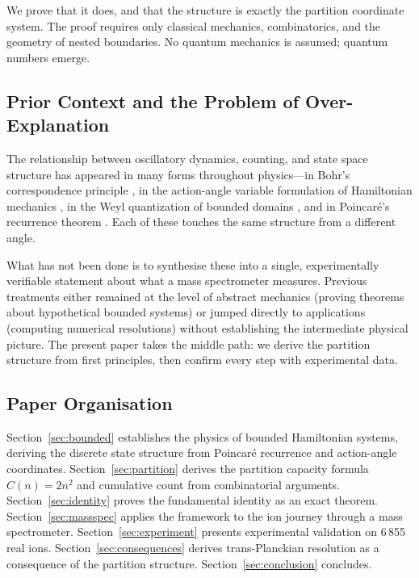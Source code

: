\documentclass[twocolumn,10pt]{article}
\begin{document}
We prove that it does, and that the structure is exactly the partition coordinate system. The proof requires only classical mechanics, combinatorics, and the geometry of nested boundaries. No quantum mechanics is assumed; quantum numbers emerge.

\subsection{Prior Context and the Problem of Over-Explanation}

The relationship between oscillatory dynamics, counting, and state space structure has appeared in many forms throughout physics---in Bohr's correspondence principle \citep{bohr1920}, in the action-angle variable formulation of Hamiltonian mechanics \citep{arnold1989}, in the Weyl quantization of bounded domains \citep{weyl1912}, and in Poincar\'e's recurrence theorem \citep{poincare1890}. Each of these touches the same structure from a different angle.

What has not been done is to synthesise these into a single, experimentally verifiable statement about what a mass spectrometer measures. Previous treatments either remained at the level of abstract mechanics (proving theorems about hypothetical bounded systems) or jumped directly to applications (computing numerical resolutions) without establishing the intermediate physical picture. The present paper takes the middle path: we derive the partition structure from first principles, then confirm every step with experimental data.

\subsection{Paper Organisation}

Section~\ref{sec:bounded} establishes the physics of bounded Hamiltonian systems, deriving the discrete state structure from Poincar\'e recurrence and action-angle coordinates. Section~\ref{sec:partition} derives the partition capacity formula $C(n) = 2n^2$ and cumulative count from combinatorial arguments. Section~\ref{sec:identity} proves the fundamental identity as an exact theorem. Section~\ref{sec:massspec} applies the framework to the ion journey through a mass spectrometer. Section~\ref{sec:experiment} presents experimental validation on 6\,855 real ions. Section~\ref{sec:consequences} derives trans-Planckian resolution as a consequence of the partition structure. Section~\ref{sec:conclusion} concludes.
\end{document}
